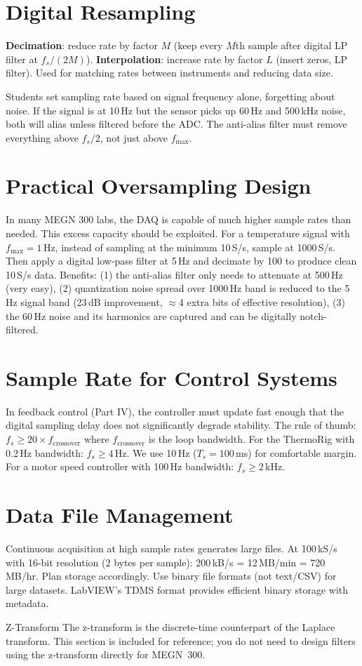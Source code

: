 \documentclass[11pt,letterpaper,twoside,openany]{book}
\begin{document}
\section{Digital Resampling}
\textbf{Decimation}: reduce rate by factor $M$ (keep every $M$th sample after digital LP filter at $f_s/(2M)$). \textbf{Interpolation}: increase rate by factor $L$ (insert zeros, LP filter). Used for matching rates between instruments and reducing data size.

\begin{tipbox}
Students set sampling rate based on signal frequency alone, forgetting about noise. If the signal is at 10\,Hz but the sensor picks up 60\,Hz and 500\,kHz noise, both will alias unless filtered before the ADC. The anti-alias filter must remove everything above $f_s/2$, not just above $f_{\max}$.
\end{tipbox}


\section{Practical Oversampling Design}
In many MEGN 300 labs, the DAQ is capable of much higher sample rates than needed. This excess capacity should be exploited. For a temperature signal with $f_{\max} = 1$\,Hz, instead of sampling at the minimum 10\,S/s, sample at 1000\,S/s. Then apply a digital low-pass filter at 5\,Hz and decimate by 100 to produce clean 10\,S/s data. Benefits: (1) the anti-alias filter only needs to attenuate at 500\,Hz (very easy), (2) quantization noise spread over 1000\,Hz band is reduced to the 5\,Hz signal band (23\,dB improvement, $\approx$4 extra bits of effective resolution), (3) the 60\,Hz noise and its harmonics are captured and can be digitally notch-filtered.

\section{Sample Rate for Control Systems}
In feedback control (Part IV), the controller must update fast enough that the digital sampling delay does not significantly degrade stability. The rule of thumb: $f_s \geq 20 \times f_{\text{crossover}}$ where $f_{\text{crossover}}$ is the loop bandwidth. For the ThermoRig with 0.2\,Hz bandwidth: $f_s \geq 4$\,Hz. We use 10\,Hz ($T_s = 100$\,ms) for comfortable margin. For a motor speed controller with 100\,Hz bandwidth: $f_s \geq 2$\,kHz.

\section{Data File Management}
Continuous acquisition at high sample rates generates large files. At 100\,kS/s with 16-bit resolution (2 bytes per sample): 200\,kB/s = 12\,MB/min = 720\,MB/hr. Plan storage accordingly. Use binary file formats (not text/CSV) for large datasets. LabVIEW's TDMS format provides efficient binary storage with metadata.
\begin{advancedbox}{Z-Transform}
The z-transform is the discrete-time counterpart of the Laplace transform. This section is included for reference; you do not need to design filters using the z-transform directly for MEGN~300.
\end{advancedbox}
\end{document}
